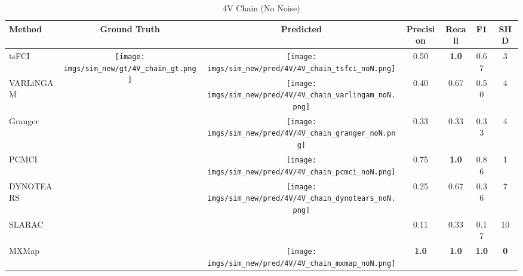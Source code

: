 \begin{table}[htb]
\begin{tabular}{l|c|c|c|c|c|c}
Method    & Ground Truth      & Predicted & Precision    & Recall       & F1           & SHD        \\ \hline
tsFCI     & \multirow{7}{*}[-0.7em]{\begin{minipage}{.17\linewidth} \centering \texttt{[image: imgs/sim\_new/gt/4V\_chain\_gt.png]} \end{minipage}} &  \begin{minipage}{.17\linewidth} \centering \texttt{[image: imgs/sim\_new/pred/4V/4V\_chain\_tsfci\_noN.png]} \end{minipage}         & 0.50         & \textbf{1.0} & 0.67         & 3          \\
VARLiNGAM &                   &  \begin{minipage}{.17\linewidth} \centering \texttt{[image: imgs/sim\_new/pred/4V/4V\_chain\_varlingam\_noN.png]} \end{minipage}     & 0.40         & 0.67         & 0.50         & 4          \\
Granger   &                   & \begin{minipage}{.17\linewidth} \centering \texttt{[image: imgs/sim\_new/pred/4V/4V\_chain\_granger\_noN.png]} \end{minipage}    & 0.33         & 0.33         & 0.33         & 4          \\
PCMCI     &                   & \begin{minipage}{.17\linewidth} \centering \texttt{[image: imgs/sim\_new/pred/4V/4V\_chain\_pcmci\_noN.png]} \end{minipage}    & 0.75         & \textbf{1.0} & 0.86         & 1          \\
DYNOTEARS &                   & \begin{minipage}{.17\linewidth} \centering \texttt{[image: imgs/sim\_new/pred/4V/4V\_chain\_dynotears\_noN.png]} \end{minipage}     & 0.25         & 0.67         & 0.36         & 7          \\
SLARAC    &                   &           & 0.11         & 0.33         & 0.17         & 10         \\ \cline{1-1} \cline{3-7} 
MXMap     &                   & \begin{minipage}{.17\linewidth} \centering \texttt{[image: imgs/sim\_new/pred/4V/4V\_chain\_mxmap\_noN.png]} \end{minipage}     & \textbf{1.0} & \textbf{1.0} & \textbf{1.0} & \textbf{0}
\end{tabular}
\caption{4V Chain (No Noise)}
\label{tab:4V_Chain_noN}
\end{table}


